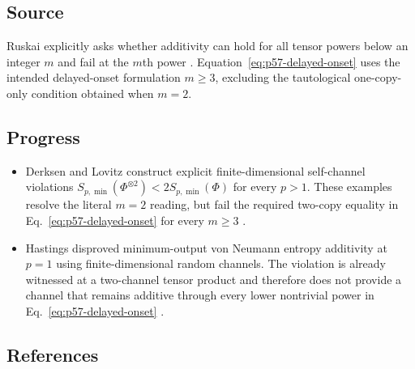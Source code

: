 \subsection*{Source}

Ruskai explicitly asks whether additivity can hold for all tensor powers
below an integer $m$ and fail at the $m$th power
.  Equation~\eqref{eq:p57-delayed-onset}
uses the intended delayed-onset formulation $m\geq3$, excluding the
tautological one-copy-only condition obtained when $m=2$.

\subsection*{Progress}

\begin{itemize}
  \item Derksen and Lovitz construct explicit finite-dimensional
  self-channel violations
  $S_{p,\min}(\Phi^{\otimes2})<2S_{p,\min}(\Phi)$ for every $p>1$.
  These examples resolve the literal $m=2$ reading, but fail the required
  two-copy equality in Eq.~\eqref{eq:p57-delayed-onset} for every
  $m\geq3$ .

  \item Hastings disproved minimum-output von Neumann entropy additivity at
  $p=1$ using finite-dimensional random channels.  The violation is already
  witnessed at a two-channel tensor product and therefore does not provide a
  channel that remains additive through every lower nontrivial power in
  Eq.~\eqref{eq:p57-delayed-onset}
  .
\end{itemize}

\subsection*{References}

